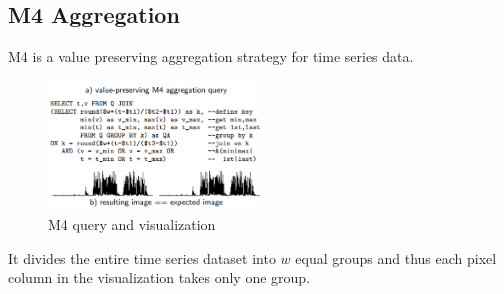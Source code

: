 \subsection{M4 Aggregation}
M4 is a value preserving aggregation strategy for time series data.
\begin{figure}[h]
	\includegraphics[width=0.5\textwidth]{m4}
	\caption{M4 query and visualization}   
	\label{fig:2}
\end{figure}
It divides the entire time series dataset into $w$ equal groups and thus each pixel column in the visualization takes only one group.